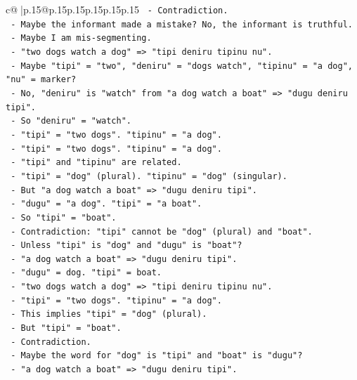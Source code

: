 \documentclass{article}
\begin{document}
{\begin{supertabular}{c@{$\;$}|p{.15\linewidth}@{}p{.15\linewidth}p{.15\linewidth}p{.15\linewidth}p{.15\linewidth}p{.15\linewidth}}
{{{\texttt{           {-} Contradiction.} \\
\texttt{       {-} Maybe the informant made a mistake? No, the informant is truthful.} \\
\texttt{       {-} Maybe I am mis{-}segmenting.} \\
\texttt{       {-} "two dogs watch a dog" => "tipi deniru tipinu nu".} \\
\texttt{         {-} Maybe "tipi" = "two", "deniru" = "dogs watch", "tipinu" = "a dog", "nu" = marker?} \\
\texttt{         {-} No, "deniru" is "watch" from "a dog watch a boat" => "dugu deniru tipi".} \\
\texttt{         {-} So "deniru" = "watch".} \\
\texttt{         {-} "tipi" = "two dogs". "tipinu" = "a dog".} \\
\texttt{         {-} "tipi" = "two dogs". "tipinu" = "a dog".} \\
\texttt{         {-} "tipi" and "tipinu" are related.} \\
\texttt{         {-} "tipi" = "dog" (plural). "tipinu" = "dog" (singular).} \\
\texttt{         {-} But "a dog watch a boat" => "dugu deniru tipi".} \\
\texttt{           {-} "dugu" = "a dog". "tipi" = "a boat".} \\
\texttt{           {-} So "tipi" = "boat".} \\
\texttt{           {-} Contradiction: "tipi" cannot be "dog" (plural) and "boat".} \\
\texttt{       {-} Unless "tipi" is "dog" and "dugu" is "boat"?} \\
\texttt{         {-} "a dog watch a boat" => "dugu deniru tipi".} \\
\texttt{           {-} "dugu" = dog. "tipi" = boat.} \\
\texttt{         {-} "two dogs watch a dog" => "tipi deniru tipinu nu".} \\
\texttt{           {-} "tipi" = "two dogs". "tipinu" = "a dog".} \\
\texttt{           {-} This implies "tipi" = "dog" (plural).} \\
\texttt{           {-} But "tipi" = "boat".} \\
\texttt{           {-} Contradiction.} \\
\texttt{       {-} Maybe the word for "dog" is "tipi" and "boat" is "dugu"?} \\
\texttt{         {-} "a dog watch a boat" => "dugu deniru tipi".} \\
}}}
\end{supertabular}}
\end{document}
